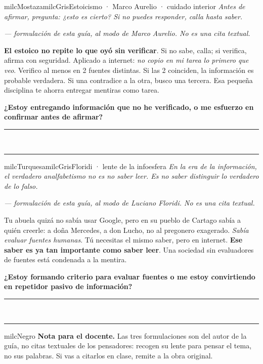 \documentclass[11pt,letterpaper]{article}
\newcommand{\linead}[1]{\noindent\color{milcLinea}\rule{#1}{0.5pt}\color{milcNegro}}
\begin{document}
\begin{softbox}{milcMostaza}{milcGris}{Estoicismo · Marco Aurelio · cuidado interior}
\textit{Antes de afirmar, pregunta: ¿esto es cierto? Si no puedes responder, calla hasta saber.}

{\footnotesize\itshape\color{milcNegro!70}--- formulación de esta guía, al modo de Marco Aurelio. No es una cita textual.}

\textbf{El estoico no repite lo que oyó sin verificar}. Si no sabe, calla; si verifica, afirma con seguridad. Aplicado a internet: \emph{no copio en mi tarea lo primero que veo}. Verifico al menos en 2 fuentes distintas. Si las 2 coinciden, la información es probable verdadera. Si una contradice a la otra, busco una tercera. Esa pequeña disciplina te ahorra entregar mentiras como tarea.

\textbf{¿Estoy entregando información que no he verificado, o me esfuerzo en confirmar antes de afirmar?}
\end{softbox}
\linead{\linewidth}\\[1mm]
\linead{\linewidth}

\begin{softbox}{milcTurquesa}{milcGris}{Floridi · lente de la infoesfera}
\textit{En la era de la información, el verdadero analfabetismo no es no saber leer. Es no saber distinguir lo verdadero de lo falso.}

{\footnotesize\itshape\color{milcNegro!70}--- formulación de esta guía, al modo de Luciano Floridi. No es una cita textual.}

Tu abuela quizá no sabía usar Google, pero en su pueblo de Cartago sabía a quién creerle: a doña Mercedes, a don Lucho, no al pregonero exagerado. \emph{Sabía evaluar fuentes humanas}. Tú necesitas el mismo saber, pero en internet. \textbf{Ese saber es ya tan importante como saber leer}. Una sociedad sin evaluadores de fuentes está condenada a la mentira.

\textbf{¿Estoy formando criterio para evaluar fuentes o me estoy convirtiendo en repetidor pasivo de información?}
\end{softbox}
\linead{\linewidth}\\[1mm]
\linead{\linewidth}

\begin{infoband}{milcNegro}
\textbf{Nota para el docente.} Las tres formulaciones son del autor de la guía, no citas textuales de los pensadores: recogen su lente para pensar el tema, no sus palabras. Si vas a citarlos en clase, remite a la obra original.
\end{infoband}
\end{document}
